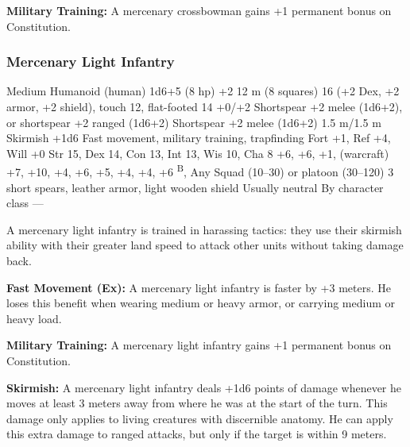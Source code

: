\textbf{Military Training:} A mercenary crossbowman gains +1 permanent bonus on Constitution.

\subsubsection{Mercenary Light Infantry}
\begin{MonsterStats}
{Medium Humanoid (human)}
{1d6+5 (8 hp)}
{+2}
{12 m (8 squares)}
{16 (+2 Dex, +2 armor, +2 shield), touch 12, flat-footed 14}
{+0/+2}
{Shortspear +2 melee (1d6+2), or shortspear +2 ranged (1d6+2)}
{Shortspear +2 melee (1d6+2)}
{1.5 m/1.5 m}
{Skirmish +1d6}
{Fast movement, military training, trapfinding}
{Fort +1, Ref +4, Will +0}
{Str 15, Dex 14, Con 13, Int 13, Wis 10, Cha 8}
{
     +6,
     +6,
     +1,
     (warcraft) +7,
     +10,
     +4,
     +6,
     +5,
     +4,
     +4,
     +6
}
{
    \textsuperscript{B},
}
{Any}
{Squad (10--30) or platoon (30--120)}
{\onehalf}
{
    3 short spears,
    leather armor,
    light wooden shield
}
{Usually neutral}
{By character class}
{---}
\end{MonsterStats}

A mercenary light infantry is trained in harassing tactics: they use their skirmish ability with their greater land speed to attack other units without taking damage back.

\textbf{Fast Movement (Ex):} A mercenary light infantry is faster by +3 meters. He loses this benefit when wearing medium or heavy armor, or carrying medium or heavy load.

\textbf{Military Training:} A mercenary light infantry gains +1 permanent bonus on Constitution.

\textbf{Skirmish:} A mercenary light infantry deals +1d6 points of damage whenever he moves at least 3 meters away from where he was at the start of the turn. This damage only applies to living creatures with discernible anatomy. He can apply this extra damage to ranged attacks, but only if the target is within 9 meters.

